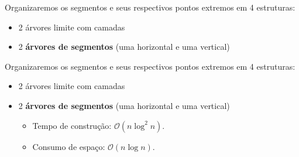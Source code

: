 \documentclass[
paper=128mm:96mm, %
fontsize=11pt, %
pagesize, %
parskip=half-, %
]{scrartcl} %
\newcommand*{\myblack}[1]{\textcolor{myblack}{#1}}
\theoremstyle{mythmstyle} %
\begin{document}
\clearpage

\begin{flushleft}
  Organizaremos os segmentos e seus respectivos pontos extremos em 4 estruturas:

  \begin{itemize}
  \item 2 árvores limite com camadas
  \item 2 \textbf{\myblack{árvores de segmentos}} (uma horizontal e uma vertical)
  \end{itemize}
\end{flushleft}
  
\clearpage


\begin{flushleft}
  Organizaremos os segmentos e seus respectivos pontos extremos em 4 estruturas:

  \begin{itemize}
  \item 2 árvores limite com camadas
  \item 2 \textbf{\myblack{árvores de segmentos}} (uma horizontal e uma vertical)
    \begin{itemize}
      \item Tempo de construção: $\mathcal{O}(n \log^2 n)$.
      \item Consumo de espaço: $\mathcal{O}(n \log n)$.
    \end{itemize}
  \end{itemize}
\end{flushleft}
  
\clearpage

\end{document}
